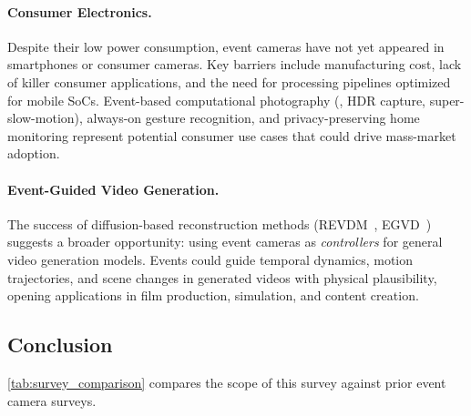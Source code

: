 \paragraph{Consumer Electronics.}
Despite their low power consumption, event cameras have not yet appeared in smartphones or consumer cameras. Key barriers include manufacturing cost, lack of killer consumer applications, and the need for processing pipelines optimized for mobile SoCs. Event-based computational photography (\eg, HDR capture, super-slow-motion), always-on gesture recognition, and privacy-preserving home monitoring represent potential consumer use cases that could drive mass-market adoption.

\paragraph{Event-Guided Video Generation.}
The success of diffusion-based reconstruction methods (REVDM~\cite{chen2025revdm}, EGVD~\cite{wang2025egvd}) suggests a broader opportunity: using event cameras as \textit{controllers} for general video generation models. Events could guide temporal dynamics, motion trajectories, and scene changes in generated videos with physical plausibility, opening applications in film production, simulation, and content creation.


\subsection{Conclusion}
\label{sec:conclusion_summary}

\cref{tab:survey_comparison} compares the scope of this survey against prior event camera surveys.

\begin{table}[t]
\centering
\caption{Comparison with prior event camera surveys. \cmark: covered; (\cmark): partially covered; \xmark: not covered.}
\label{tab:survey_comparison}
\end{table}

